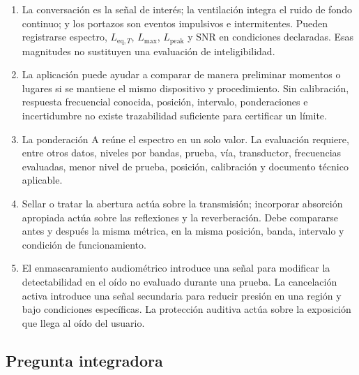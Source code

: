 \begin{enumerate}[label=\textbf{F\arabic*.},leftmargin=*]
    \item La conversación es la señal de interés; la ventilación integra el
    ruido de fondo continuo; y los portazos son eventos impulsivos e
    intermitentes. Pueden registrarse espectro, \(L_{\mathrm{eq},T}\),
    \(L_{\mathrm{max}}\), \(L_{\mathrm{peak}}\) y SNR en condiciones
    declaradas. Esas magnitudes no sustituyen una evaluación de
    inteligibilidad.

    \item La aplicación puede ayudar a comparar de manera preliminar momentos
    o lugares si se mantiene el mismo dispositivo y procedimiento. Sin
    calibración, respuesta frecuencial conocida, posición, intervalo,
    ponderaciones e incertidumbre no existe trazabilidad suficiente para
    certificar un límite.

    \item La ponderación A reúne el espectro en un solo valor. La evaluación
    requiere, entre otros datos, niveles por bandas, prueba, vía, transductor,
    frecuencias evaluadas, menor nivel de prueba, posición, calibración y
    documento técnico aplicable.

    \item Sellar o tratar la abertura actúa sobre la transmisión; incorporar
    absorción apropiada actúa sobre las reflexiones y la reverberación. Debe
    compararse antes y después la misma métrica, en la misma posición, banda,
    intervalo y condición de funcionamiento.

    \item El enmascaramiento audiométrico introduce una señal para modificar
    la detectabilidad en el oído no evaluado durante una prueba. La
    cancelación activa introduce una señal secundaria para reducir presión en
    una región y bajo condiciones específicas. La protección auditiva actúa
    sobre la exposición que llega al oído del usuario.
\end{enumerate}

\subsection*{Pregunta integradora}

